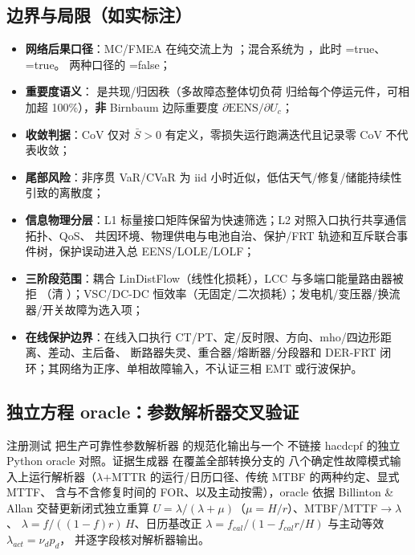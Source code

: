 \subsection{边界与局限（如实标注）}
\begin{itemize}
  \item \textbf{网络后果口径}：MC/FMEA 在纯交流上为
        ；混合系统为
        ，此时
        =true、=true。
        两种口径的 =false；
  \item \textbf{重要度语义}： 是共现/归因秩（多故障态整体切负荷
        归给每个停运元件，可相加超 100\%），\textbf{非} Birnbaum 边际重要度 $\partial\mathrm{EENS}/\partial U_c$；
  \item \textbf{收敛判据}：CoV 仅对 $\bar S>0$ 有定义，零损失运行跑满迭代且记录零 CoV 不代表收敛；
  \item \textbf{尾部风险}：非序贯 VaR/CVaR 为 iid 小时近似，低估天气/修复/储能持续性引致的离散度；
  \item \textbf{信息物理分层}：L1 标量接口矩阵保留为快速筛选；L2 对照入口执行共享通信拓扑、QoS、
        共因环境、物理供电与电池自治、保护/FRT 轨迹和互斥联合事件树，保护误动进入总 EENS/LOLE/LOLF；
  \item \textbf{三阶段范围}：耦合 LinDistFlow（线性化损耗），LCC 与多端口能量路由器被拒
        （清 ）；VSC/DC-DC 恒效率（无固定/二次损耗）；发电机/变压器/换流器/开关故障为选入项；
  \item \textbf{在线保护边界}：在线入口执行 CT/PT、定/反时限、方向、mho/四边形距离、差动、主后备、
        断路器失灵、重合器/熔断器/分段器和 DER-FRT 闭环；其网络为正序、单相故障输入，不认证三相 EMT 或行波保护。
\end{itemize}

\subsection{独立方程 oracle：参数解析器交叉验证}\label{sec:rel-resolver-xref}
注册测试  把生产可靠性参数解析器
 的规范化输出与一个
不链接 hacdcpf 的独立 Python oracle 对照。证据生成器
 在覆盖全部转换分支的
八个确定性故障模式输入上运行解析器（$\lambda$+MTTR 的运行/日历口径、传统 MTBF 的两种约定、显式 MTTF、
含与不含修复时间的 FOR、以及主动按需），oracle 
依据 Billinton \& Allan 交替更新闭式独立重算 $U=\lambda/(\lambda+\mu)$（$\mu=H/r$）、MTBF/MTTF$\to\lambda$、
$\lambda=f/((1-f)r)\,H$、日历基改正 $\lambda=f_{cal}/(1-f_{cal}r/H)$ 与主动等效 $\lambda_{act}=\nu_d p_d$，
并逐字段核对解析器输出。

